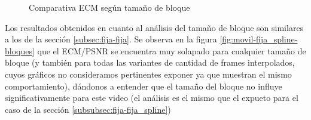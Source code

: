 \begin{figure}[H]
    \centering
    \hspace{10pt}
    \caption{Comparativa ECM seg\'un tama\~no de bloque}
    \label{fig:movil-fija_stats-spline_k10}
\end{figure}

\par Los resultados obtenidos en cuanto al an\'alisis del tama\~no de bloque
son similares a los de la secci\'on \ref{subsec:fija-fija}. Se observa en la
figura \ref{fig:movil-fija_spline-bloques} que el ECM/PSNR se encuentra muy
solapado para cualquier tama\~no de bloque (y tambi\'en para todas las variantes
de cantidad de frames interpolados, cuyos gr\'aficos no consideramos pertinentes
exponer ya que muestran el mismo comportamiento), d\'andonos a entender que
el tama\~no del bloque no influye significativamente para este video (el
an\'alisis es el mismo que el expueto para el caso de la secci\'on
\ref{subsubsec:fija-fija_spline})

